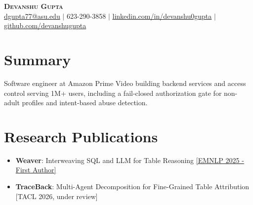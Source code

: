 \documentclass[letterpaper,11pt]{article}
\begin{document}
\begin{center}
    \textbf{\Huge \scshape Devanshu Gupta} \\ \vspace{5pt}
    \small
    \href{mailto:dgupta77@asu.edu}{dgupta77@asu.edu} $|$
    623-290-3858 $|$ \small{\href{https://www.linkedin.com/in/devanshu0gupta}{linkedin.com/in/devanshu0gupta}}
    $|$ {\href{https://www.github.com/devanshugupta}{github.com/devanshugupta}}
\end{center}
\section{Summary}
 \small{Software engineer at Amazon Prime Video building backend services and access control serving 1M+ users, including a fail-closed authorization gate for non-adult profiles and intent-based abuse detection.}

\section{Research Publications}
\vspace{-2pt}
\begin{itemize}[leftmargin=0in, label={}, itemsep=-2pt, topsep=0pt]
\small
\item \textbf{Weaver}: Interweaving SQL and LLM for Table Reasoning \href{https://aclanthology.org/2025.emnlp-main.1436/}{[EMNLP 2025 - First Author]}

\item \textbf{TraceBack}: Multi-Agent Decomposition for Fine-Grained Table Attribution [TACL 2026, under review]
\end{itemize}

\end{document}
